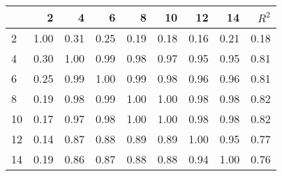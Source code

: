 \begin{tabular}{lrrrrrrrr}
\toprule
{} &     2 &     4 &     6 &     8 &    10 &    12 &    14 &  $R^2$ \\
\midrule
2  &  1.00 &  0.31 &  0.25 &  0.19 &  0.18 &  0.16 &  0.21 &   0.18 \\
4  &  0.30 &  1.00 &  0.99 &  0.98 &  0.97 &  0.95 &  0.95 &   0.81 \\
6  &  0.25 &  0.99 &  1.00 &  0.99 &  0.98 &  0.96 &  0.96 &   0.81 \\
8  &  0.19 &  0.98 &  0.99 &  1.00 &  1.00 &  0.98 &  0.98 &   0.82 \\
10 &  0.17 &  0.97 &  0.98 &  1.00 &  1.00 &  0.98 &  0.98 &   0.82 \\
12 &  0.14 &  0.87 &  0.88 &  0.89 &  0.89 &  1.00 &  0.95 &   0.77 \\
14 &  0.19 &  0.86 &  0.87 &  0.88 &  0.88 &  0.94 &  1.00 &   0.76 \\
\bottomrule
\end{tabular}
